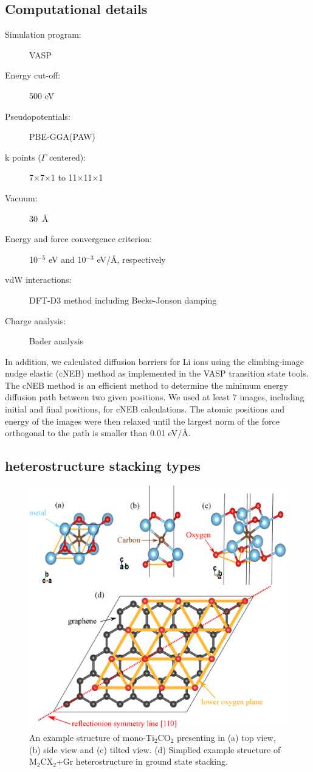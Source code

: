 \subsection{Computational details}
\begin{footnotesize}
\begin{description}
\item[Simulation program:] VASP
\item[Energy cut-off:] 500 eV
\item[Pseudopotentials:] PBE-GGA(PAW)
\item[k points ($\Gamma$ centered):] 7$\times$7$\times$1 to 11$\times$11$\times$1
\item[Vacuum:] 30~\AA
\item[Energy and force convergence criterion:] 10$^{-5}$ eV and 10$^{-3}$ eV/\AA, respectively
\item[vdW interactions:] DFT-D3 method \citet{Grimme2011} including Becke-Jonson damping
\item[Charge analysis:] Bader analysis \cite{Bader1,Bader2,Bader3,Bader4}
\end{description}
\end{footnotesize}
In addition, we calculated diffusion barriers for Li ions using the climbing-image nudge elastic (cNEB) method as implemented in the VASP transition state tools\cite{c-neb1,c-neb2}. The cNEB method is an efficient method to determine the minimum energy diffusion path between two given positions. We used at least 7 images, including initial and final positions, for cNEB calculations. The atomic positions and energy of the images were then relaxed until the largest norm of the force orthogonal to the path is smaller than 0.01 eV/{\AA}. 

\subsection{heterostructure stacking types}
\begin{figure}[htb]
\centering
\includegraphics[width=0.8\linewidth]{stacking.eps}%
\caption{An example structure of mono-Ti$_2$CO$_2$ presenting in (a) top view, (b) side view and (c) tilted view. (d)  Simplied example structure of M$_2$CX$_2$+Gr heterostructure in ground state stacking. \label{Li_stacking}}
\end{figure}

